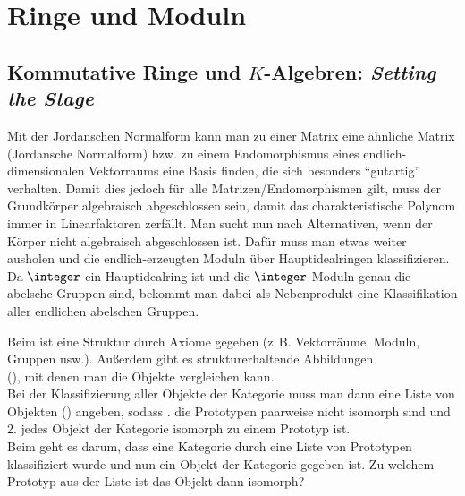 \section{%
    Ringe und Moduln%
}

\subsection{%
    Kommutative Ringe und \texorpdfstring{$K$}{K}-Algebren: \emph{Setting the Stage}%
}

\begin{Bem}
    Mit der Jordanschen Normalform kann man zu einer Matrix eine ähnliche
    Matrix (Jordansche Normalform) bzw. zu einem Endomorphismus eines
    endlich-dimensionalen Vektorraums eine Basis finden, die sich besonders
    "`gutartig"' verhalten.
    Damit dies jedoch für alle Matrizen/Endomorphismen gilt, muss der
    Grundkörper algebraisch abgeschlossen sein, damit das charakteristische
    Polynom immer in Linearfaktoren zerfällt.
    Man sucht nun nach Alternativen, wenn der Körper nicht algebraisch
    abgeschlossen ist.
    Dafür muss man etwas weiter ausholen und die endlich-erzeugten Moduln
    über Hauptidealringen klassifizieren. \\
    Da $\integer$ ein Hauptidealring ist und die $\integer$-Moduln
    genau die abelsche Gruppen sind, bekommt man dabei als Nebenprodukt
    eine Klassifikation aller endlichen abelschen Gruppen.
\end{Bem}

\begin{Bem}
    Beim  ist eine Struktur durch Axiome
    gegeben (z.\,B. Vektorräume, Moduln, Gruppen usw.).
    Außerdem gibt es strukturerhaltende Abbildungen\\
    (),
    mit denen man die Objekte vergleichen kann. \\
    Bei der Klassifizierung aller Objekte der Kategorie muss man dann eine
    Liste von Objekten () angeben, sodass . die Prototypen paarweise nicht isomorph sind und \\
    2. jedes Objekt der Kategorie isomorph zu einem Prototyp ist. \\
    Beim  geht es darum, dass eine Kategorie
    durch eine Liste von Prototypen klassifiziert wurde und nun
    ein Objekt der Kategorie gegeben ist.
    Zu welchem Prototyp aus der Liste ist das Objekt dann isomorph?
\end{Bem}

